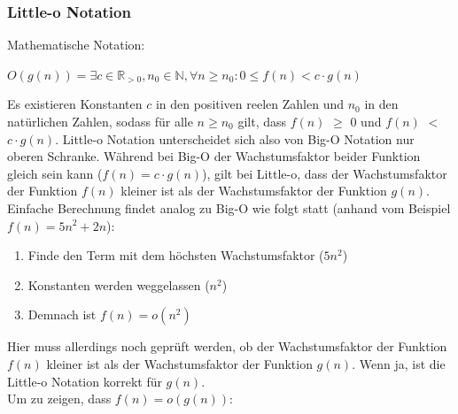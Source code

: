 \documentclass[ngerman,
color=3b,
load_common, %
boxarc,
main,
tikz,
border=3mm
]{article}
\begin{document}
\subsubsection{Little-o Notation}
Mathematische Notation:
\begin{center}
    $O(g(n)) = \exists c \in \mathbb{R}_{>0}, n_0 \in \mathbb{N}, \forall n \geq n_0:  0 \leq f(n) < c \cdot g(n)$
\end{center}
Es existieren Konstanten $c$ in den positiven reelen Zahlen und $n_0$ in den natürlichen Zahlen, sodass für alle $n \geq n_0$ gilt, dass  $f(n)$ \color{teal}$\geq$ \color{black} 0 und $f(n)$ \color{red}$<$ \color{black}$c \cdot g(n)$. Little-o Notation unterscheidet sich also von Big-O Notation nur oberen Schranke. Während bei Big-O der Wachstumsfaktor beider Funktion gleich sein kann ($f(n) = c \cdot g(n)$), gilt bei Little-o, dass der Wachstumsfaktor der Funktion $f(n)$ kleiner ist als der Wachstumsfaktor der Funktion $g(n)$. \\
Einfache Berechnung findet analog zu Big-O wie folgt statt (anhand vom Beispiel $f(n) = 5n^2 + 2n$):
\begin{enumerate}
    \item Finde den Term mit dem höchsten Wachstumsfaktor ($5n^2$)
    \item Konstanten werden weggelassen ($n^2$)
    \item Demnach ist $f(n) = o(n^2)$
\end{enumerate}
Hier muss allerdings noch geprüft werden, ob der Wachstumsfaktor der Funktion $f(n)$ kleiner ist als der Wachstumsfaktor der Funktion $g(n)$. Wenn ja, ist die Little-o Notation korrekt für $g(n)$. \\
Um zu zeigen, dass $f(n) = o(g(n))$:
\end{document}
